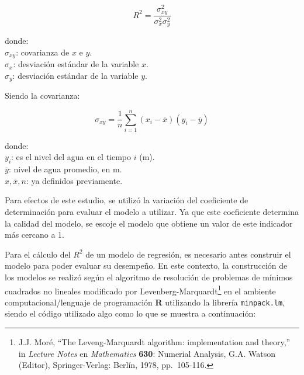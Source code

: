 \documentclass[]{article}
\let\rmarkdownfootnote\footnote%
\def\footnote{\protect\rmarkdownfootnote}
\begin{document}
\[{R^2} = \frac{{\sigma _{xy}^2}}{{\sigma _x^2\sigma _y^2}}\]

donde:\\
\(\sigma _{xy}\): covarianza de \(x\) e \(y\).\\
\(\sigma _{x}\): desviación estándar de la variable \(x\).\\
\(\sigma _{y}\): desviación estándar de la variable \(y\).

Siendo la covarianza:

\[{\sigma _{xy}} = \frac{1}{n}\sum\limits_{i = 1}^n {\left( {{x_i} - \bar x} \right)\left( {{y_i} - \bar y} \right)} \]

donde:\\
\(y_i\): es el nivel del agua en el tiempo \(i\) (m).\\
\(\bar y\): nivel de agua promedio, en m.\\
\(x, \bar x, n\): ya definidos previamente.

Para efectos de este estudio, se utilizó la variación del coeficiente de
determinación para evaluar el modelo a utilizar. Ya que este coeficiente
determina la calidad del modelo, se escoje el modelo que obtiene un
valor de este indicador más cercano a 1.

Para el cálculo del \(R^2\) de un modelo de regresión, es necesario
antes construir el modelo para poder evaluar su desempeño. En este
contexto, la construcción de los modelos se realizó según el algoritmo
de resolución de problemas de mínimos cuadrados no lineales modificado
por Levenberg-Marquardt\footnote{J.J. Moré, ``The Leveng-Marquardt
  algorithm: implementation and theory,'' in \emph{Lecture Notes} en
  \emph{Mathematics} \textbf{630}: Numerial Analysis, G.A. Watson
  (Editor), Springer-Verlag: Berlín, 1978, pp.~105-116.} en el ambiente
computacional/lenguaje de programación \textbf{R} utilizando la librería
\texttt{minpack.lm}, siendo el código utilizado algo como lo que se
muestra a continuación:
\end{document}

